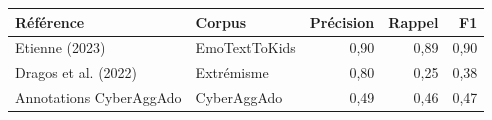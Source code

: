 \begin{tabular}{llrrr}
\toprule
\textbf{Référence} & \textbf{Corpus} & \textbf{Précision} & \textbf{Rappel} & \textbf{F1} \\
\midrule
Etienne (2023) & EmoTextToKids & 0,90 & 0,89 & 0,90 \\
Dragos et al. (2022) & Extrémisme & 0,80 & 0,25 & 0,38 \\
Annotations CyberAggAdo & CyberAggAdo & 0,49 & 0,46 & 0,47 \\
\bottomrule
\end{tabular}
